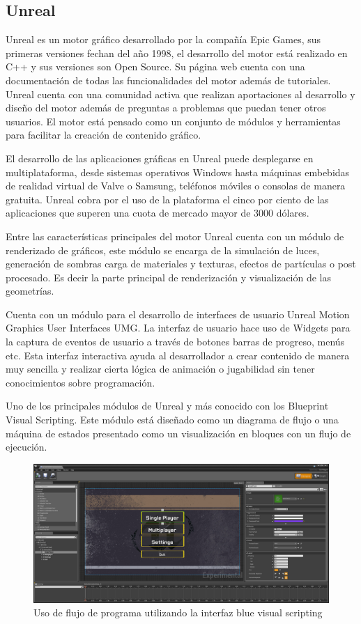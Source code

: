 \documentclass[a4paper, 17pt]{book}
\begin{document}
\subsection{Unreal} 
\label{subsec:Unreal}

Unreal es un motor gráfico desarrollado por la compañía Epic Games, sus primeras versiones fechan del año
1998, el desarrollo del motor está realizado en C++ y sus versiones son Open Source. Su página web cuenta
con una documentación de todas las funcionalidades del motor además de tutoriales. Unreal cuenta con una
comunidad activa que realizan aportaciones al desarrollo y diseño del motor además de preguntas a problemas
que puedan tener otros usuarios. El motor está pensado como un conjunto de módulos y herramientas para
facilitar la creación de contenido gráfico.

El desarrollo de las aplicaciones gráficas en Unreal puede desplegarse en multiplataforma, desde sistemas
operativos Windows hasta máquinas embebidas de realidad virtual de Valve o Samsung, teléfonos móviles o
consolas de manera gratuita. Unreal cobra por el uso de la plataforma el cinco por ciento de las aplicaciones que
superen una cuota de mercado mayor de 3000 dólares.

Entre las características principales del motor Unreal cuenta con un módulo de renderizado de gráficos, este
módulo se encarga de la simulación de luces, generación de sombras carga de materiales y texturas, efectos
de partículas o post procesado. Es decir la parte principal de renderización y visualización de las geometrías.

Cuenta con un módulo para el desarrollo de interfaces de usuario Unreal Motion Graphics User Interfaces UMG.
La interfaz de usuario hace uso de Widgets para la captura de eventos de usuario a través de botones barras
de progreso, menús etc. Esta interfaz interactiva ayuda al desarrollador a crear contenido de manera muy
sencilla y realizar cierta lógica de animación o jugabilidad sin tener conocimientos sobre programación.

Uno de los principales módulos de Unreal y más conocido con los Blueprint Visual Scripting. Este módulo
está diseñado como un diagrama de flujo o una máquina de estados presentado como un visualización en
bloques con un flujo de ejecución.

\begin{figure}[hbt!]
    \centering
    \includegraphics[scale=0.30, keepaspectratio]{img/menu_unreal.png}
    \caption{Uso de flujo de programa utilizando la interfaz blue visual scripting}
    \label{figura:menu_unreal}
\end{figure}
\end{document}
